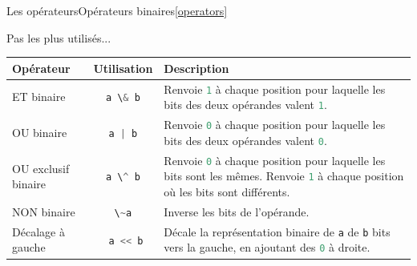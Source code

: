 \documentclass{beamer}
\begin{document}
\begin{frame}{Les opérateurs}{Opérateurs binaires\cref{operators}}
    \begin{scriptsize}
        Pas les plus utilisés...
        \begin{table}[h!]
            \centering
            \begin{tabular}{|p{3cm}|c|p{6cm}|}
                \hline
                \textbf{Opérateur}                                                      & \textbf{Utilisation}                     & \textbf{Description}                                                                                                                                                                                                           \\
                \hline
                ET binaire                                                              & \lstinline[language=Javascript]!a \& b!  & Renvoie \lstinline[language=Javascript]!1! à chaque position pour laquelle les bits des deux opérandes valent \lstinline[language=Javascript]!1!.                                                                              \\
                \hline
                OU binaire                                                              & \lstinline[language=Javascript]!a | b!   & Renvoie \lstinline[language=Javascript]!0! à chaque position pour laquelle les bits des deux opérandes valent \lstinline[language=Javascript]!0!.                                                                              \\
                \hline
                OU exclusif binaire                                                     & \lstinline[language=Javascript]!a \^ b!  & Renvoie \lstinline[language=Javascript]!0! à chaque position pour laquelle les bits sont les mêmes. Renvoie \lstinline[language=Javascript]!1! à chaque position où les bits sont différents.                                  \\
                \hline
                NON binaire                                                             & \lstinline[language=Javascript]!\~a!     & Inverse les bits de l'opérande.                                                                                                                                                                                                \\
                \hline
                Décalage à gauche                                                       & \lstinline[language=Javascript]! a << b! & Décale la représentation binaire de \lstinline[language=Javascript]!a! de \lstinline[language=Javascript]!b! bits vers la gauche, en ajoutant des \lstinline[language=Javascript]!0! à droite.                                 \\

\end{tabular}
\end{table}
\end{scriptsize}
\end{frame}
\end{document}
